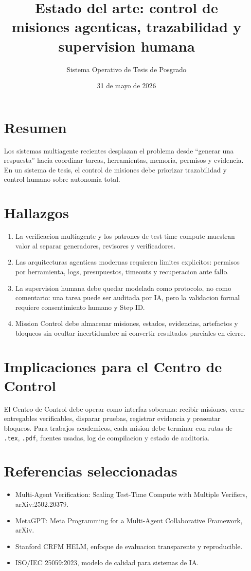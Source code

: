 \documentclass[11pt]{article}
\title{Estado del arte: control de misiones agenticas, trazabilidad y supervision humana}
\author{Sistema Operativo de Tesis de Posgrado}
\date{31 de mayo de 2026}
\begin{document}
\maketitle

\section*{Resumen}
Los sistemas multiagente recientes desplazan el problema desde ``generar una respuesta'' hacia coordinar tareas, herramientas, memoria, permisos y evidencia. En un sistema de tesis, el control de misiones debe priorizar trazabilidad y control humano sobre autonomia total.

\section*{Hallazgos}
\begin{enumerate}[leftmargin=*]
\item La verificacion multiagente y los patrones de test-time compute muestran valor al separar generadores, revisores y verificadores.
\item Las arquitecturas agenticas modernas requieren limites explicitos: permisos por herramienta, logs, presupuestos, timeouts y recuperacion ante fallo.
\item La supervision humana debe quedar modelada como protocolo, no como comentario: una tarea puede ser auditada por IA, pero la validacion formal requiere consentimiento humano y Step ID.
\item Mission Control debe almacenar misiones, estados, evidencias, artefactos y bloqueos sin ocultar incertidumbre ni convertir resultados parciales en cierre.
\end{enumerate}

\section*{Implicaciones para el Centro de Control}
El Centro de Control debe operar como interfaz soberana: recibir misiones, crear entregables verificables, disparar pruebas, registrar evidencia y presentar bloqueos. Para trabajos academicos, cada mision debe terminar con rutas de \texttt{.tex}, \texttt{.pdf}, fuentes usadas, log de compilacion y estado de auditoria.

\section*{Referencias seleccionadas}
\begin{itemize}[leftmargin=*]
\item Multi-Agent Verification: Scaling Test-Time Compute with Multiple Verifiers, arXiv:2502.20379.
\item MetaGPT: Meta Programming for a Multi-Agent Collaborative Framework, arXiv.
\item Stanford CRFM HELM, enfoque de evaluacion transparente y reproducible.
\item ISO/IEC 25059:2023, modelo de calidad para sistemas de IA.
\end{itemize}
\end{document}
